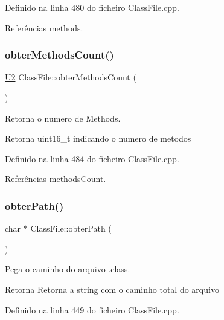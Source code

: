 Definido na linha 480 do ficheiro Class\+File.\+cpp.



Referências methods.

\mbox{\label{classClassFile_a16409bc8b58eb4965a1e39497cc300d8}} 
\subsubsection{\texorpdfstring{obter\+Methods\+Count()}{obterMethodsCount()}}
{\footnotesize\ttfamily \hyperlink{BasicTypes_8h_a90240657108b1b457eef9d3f76e0202e}{U2} Class\+File\+::obter\+Methods\+Count (\begin{DoxyParamCaption}{ }\end{DoxyParamCaption})}



Retorna o numero de Methods. 

\begin{DoxyReturn}{Retorna}
uint16\+\_\+t indicando o numero de metodos 
\end{DoxyReturn}


Definido na linha 484 do ficheiro Class\+File.\+cpp.



Referências methods\+Count.

\mbox{\label{classClassFile_a4803bd3f325fbab1bf9c0f774b3a8c97}} 
\subsubsection{\texorpdfstring{obter\+Path()}{obterPath()}}
{\footnotesize\ttfamily char $\ast$ Class\+File\+::obter\+Path (\begin{DoxyParamCaption}{ }\end{DoxyParamCaption})}



Pega o caminho do arquivo .class. 

\begin{DoxyReturn}{Retorna}
Retorna a string com o caminho total do arquivo 
\end{DoxyReturn}


Definido na linha 449 do ficheiro Class\+File.\+cpp.




